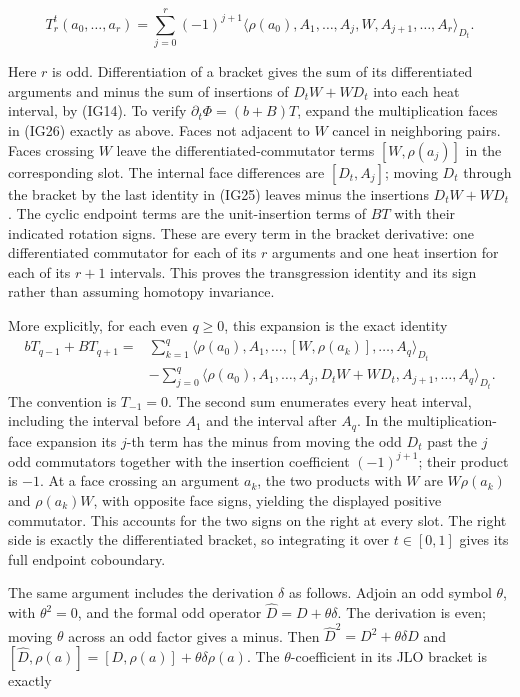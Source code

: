\documentclass[
  11pt,
]{article}
\begin{document}
\[
 T_r^t(a_0,\ldots,a_r)=
   \sum_{j=0}^r(-1)^{j+1}
    \langle\rho(a_0),A_1,\ldots,A_j,W,
                            A_{j+1},\ldots,A_r\rangle_{D_t}.
\tag{IG26}
\]

Here \(r\) is odd. Differentiation of a bracket gives the sum of its
differentiated arguments and minus the sum of insertions of
\(D_tW+WD_t\) into each heat interval, by (IG14). To verify
\(\partial_t\Phi=(b+B)T\), expand the multiplication faces in (IG26)
exactly as above. Faces not adjacent to \(W\) cancel in neighboring
pairs. Faces crossing \(W\) leave the differentiated-commutator terms
\([W,\rho(a_j)]\) in the corresponding slot. The internal face
differences are \([D_t,A_j]\); moving \(D_t\) through the bracket by the
last identity in (IG25) leaves minus the insertions \(D_tW+WD_t\). The
cyclic endpoint terms are the unit-insertion terms of \(BT\) with their
indicated rotation signs. These are every term in the bracket
derivative: one differentiated commutator for each of its \(r\)
arguments and one heat insertion for each of its \(r+1\) intervals. This
proves the transgression identity and its sign rather than assuming
homotopy invariance.

More explicitly, for each even \(q\geq0\), this expansion is the exact
identity \[
\begin{split}
 bT_{q-1}+BT_{q+1}
 ={}&\sum_{k=1}^q
 \langle\rho(a_0),A_1,\ldots,[W,\rho(a_k)],\ldots,A_q\rangle_{D_t}\\
 &-\sum_{j=0}^q
 \langle\rho(a_0),A_1,\ldots,A_j,D_tW+WD_t,
                              A_{j+1},\ldots,A_q\rangle_{D_t}.
\end{split}
\] The convention is \(T_{-1}=0\). The second sum enumerates every heat
interval, including the interval before \(A_1\) and the interval after
\(A_q\). In the multiplication-face expansion its \(j\)-th term has the
minus from moving the odd \(D_t\) past the \(j\) odd commutators
together with the insertion coefficient \((-1)^{j+1}\); their product is
\(-1\). At a face crossing an argument \(a_k\), the two products with
\(W\) are \(W\rho(a_k)\) and \(\rho(a_k)W\), with opposite face signs,
yielding the displayed positive commutator. This accounts for the two
signs on the right at every slot. The right side is exactly the
differentiated bracket, so integrating it over \(t\in[0,1]\) gives its
full endpoint coboundary.

The same argument includes the derivation \(\delta\) as follows. Adjoin
an odd symbol \(\theta\), with \(\theta^2=0\), and the formal odd
operator \(\widehat D=D+\theta\delta\). The derivation is even; moving
\(\theta\) across an odd factor gives a minus. Then
\(\widehat D^2=D^2+\theta\delta D\) and
\([\widehat D,\rho(a)]=[D,\rho(a)]+\theta\delta\rho(a)\). The
\(\theta\)-coefficient in its JLO bracket is exactly
\end{document}

